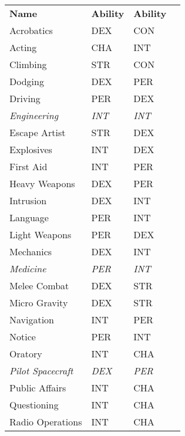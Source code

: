 \documentclass[8pt,landscape,a4paper]{article}
\begin{document}
\begin{multicols}{4}
\begin{center}
  \begin{tabular}{llll}
\textbf{Name}             & \textbf{Ability} &  \textbf{Ability} &  \\
Acrobatics                & DEX          & CON          &  \\
Acting                    & CHA          & INT          &  \\
Climbing                  & STR          & CON          &  \\
Dodging                   & DEX          & PER          &  \\
Driving                   & PER          & DEX          &  \\
\textit{Engineering}      & \textit{INT} & \textit{INT} &  \\
Escape Artist             & STR          & DEX          &  \\
Explosives                & INT          & DEX          &  \\
First Aid                 & INT          & PER          &  \\
Heavy Weapons             & DEX          & PER          &  \\
Intrusion                 & DEX          & INT          &  \\
Language                  & PER          & INT          &  \\
Light Weapons             & PER          & DEX          &  \\
Mechanics                 & DEX          & INT          &  \\
\textit{Medicine}         & \textit{PER} & \textit{INT} &  \\
Melee Combat              & DEX          & STR          &  \\
Micro Gravity             & DEX          & STR          &  \\
Navigation                & INT          & PER          &  \\
Notice                    & PER          & INT          &  \\
Oratory                   & INT          & CHA          &  \\
\textit{Pilot Spacecraft} & \textit{DEX} & \textit{PER} &  \\
Public Affairs            & INT          & CHA          &  \\
Questioning               & INT          & CHA          &  \\
Radio Operations          & INT          & CHA          &  \\

\end{tabular}
\end{center}
\end{multicols}
\end{document}
